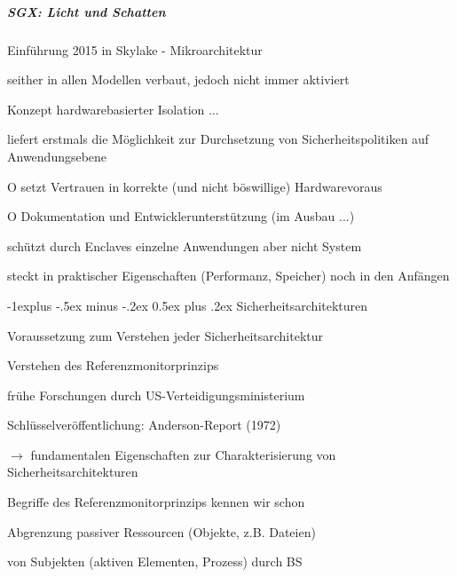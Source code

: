 \documentclass[a4paper]{article}
\makeatletter
\newcommand{\cmark}{\ding{51}}
\newcommand{\xmark}{\ding{55}}
\renewcommand{\subsection}{\@startsection{subsection}{2}{0mm}%
 {-1explus -.5ex minus -.2ex}%
 {0.5ex plus .2ex}%
 {\normalfont\normalsize\bfseries}}
\makeatother
\begin{document}
\begin{multicols}{3}
    \subparagraph{SGX: Licht und Schatten}
    \begin{itemize*}
        \item Einführung 2015 in Skylake - Mikroarchitektur
        \item seither in allen Modellen verbaut, jedoch nicht immer aktiviert
        \item Konzept hardwarebasierter Isolation ...
        \item[\cmark] liefert erstmals die Möglichkeit zur Durchsetzung von Sicherheitspolitiken auf Anwendungsebene
        \item[O]setzt Vertrauen in korrekte (und nicht böswillige) Hardwarevoraus
        \item[O]Dokumentation und Entwicklerunterstützung (im Ausbau ...)
        \item[\xmark] schützt durch Enclaves einzelne Anwendungen aber nicht System
        \item[\xmark] steckt in praktischer Eigenschaften (Performanz, Speicher) noch in den Anfängen
    \end{itemize*}

    \subsection{Sicherheitsarchitekturen}
    \begin{itemize*}
        \item Voraussetzung zum Verstehen jeder Sicherheitsarchitektur
        \begin{itemize*}
            \item Verstehen des Referenzmonitorprinzips
            \item frühe Forschungen durch US-Verteidigungsministerium
            \item Schlüsselveröffentlichung: Anderson-Report (1972)
            \item[$\rightarrow$] fundamentalen Eigenschaften zur Charakterisierung von Sicherheitsarchitekturen
        \end{itemize*}
        \item Begriffe des Referenzmonitorprinzips kennen wir schon
        \begin{itemize*}
            \item Abgrenzung passiver Ressourcen (Objekte, z.B. Dateien)
            \item von Subjekten (aktiven Elementen, Prozess) durch BS
        \end{itemize*}
    \end{itemize*}


\end{multicols}
\end{document}
